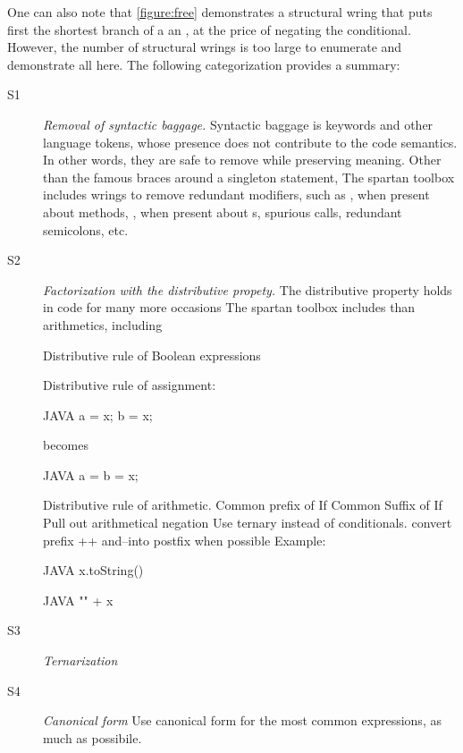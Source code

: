 One can also note that \cref{figure:free} demonstrates
  a structural wring that puts first the shortest branch of a
  an , at the price of negating the conditional.
However, the number of structural wrings is too large to enumerate and
demonstrate all here. The following categorization provides a summary:

\begin{description}
  \item[S1] \emph{Removal of syntactic baggage.} 
    Syntactic baggage is keywords and other language tokens,
     whose presence does not contribute to the code semantics.
    In other words, they are safe to remove while preserving meaning. 
    Other than the famous braces around a singleton statement, 
    The spartan toolbox includes wrings to remove redundant modifiers,
    such as , when present about  methods, ,
    when present about s, spurious \cc{()} calls, redundant
    semicolons, etc.

\item[S2] \emph{Factorization with the distributive propety.}
  The distributive property holds in code for many more occasions
  The spartan toolbox includes
  than arithmetics, including 
   
  Distributive rule of Boolean expressions

  Distributive rule of assignment:
\begin{code}{JAVA}
a = x;
b = x;
\end{code}
  becomes
  \begin{code}{JAVA}
a = b = x;
  \end{code}
  Distributive rule of arithmetic.
    Common prefix of If
    Common Suffix of If
    Pull out arithmetical negation
    Use ternary instead of conditionals.
    convert prefix ++ and--into postfix when possible
    Example:
        \begin{code}{JAVA}
x.toString()
  \end{code}
  \begin{code}{JAVA}
"" + x
  \end{code}

\item[S3] \emph{Ternarization}

\item[S4] \emph{Canonical form} 
Use canonical form for the most common expressions, as much as possibile.


\end{description}
